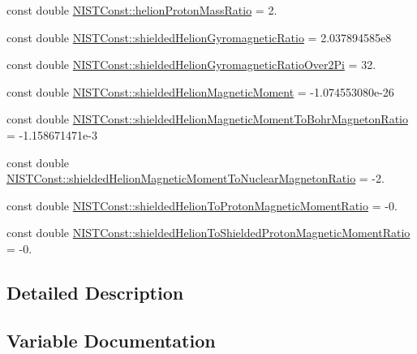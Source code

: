 \begin{DoxyCompactItemize}
\item 
const double \hyperlink{group___n_i_s_t_const-_helion_ga6ddd4a293fd1d7adac9a20dc6ee2a7d6}{N\+I\+S\+T\+Const\+::helion\+Proton\+Mass\+Ratio} = 2.
\item 
const double \hyperlink{group___n_i_s_t_const-_helion_gaf3b7dabd6de7a263aba710256e793c8e}{N\+I\+S\+T\+Const\+::shielded\+Helion\+Gyromagnetic\+Ratio} = 2.\+037894585e8
\item 
const double \hyperlink{group___n_i_s_t_const-_helion_gaed43f2ab9c5e89c6dda577a3b5fc265c}{N\+I\+S\+T\+Const\+::shielded\+Helion\+Gyromagnetic\+Ratio\+Over2\+Pi} = 32.
\item 
const double \hyperlink{group___n_i_s_t_const-_helion_ga1b0f92c14390afe726af4005e21c2ae8}{N\+I\+S\+T\+Const\+::shielded\+Helion\+Magnetic\+Moment} = -\/1.\+074553080e-\/26
\item 
const double \hyperlink{group___n_i_s_t_const-_helion_gac48304d45406c207fbadeca604d5c71a}{N\+I\+S\+T\+Const\+::shielded\+Helion\+Magnetic\+Moment\+To\+Bohr\+Magneton\+Ratio} = -\/1.\+158671471e-\/3
\item 
const double \hyperlink{group___n_i_s_t_const-_helion_gae3bf1eccb33e00a6da688959fd99bbb3}{N\+I\+S\+T\+Const\+::shielded\+Helion\+Magnetic\+Moment\+To\+Nuclear\+Magneton\+Ratio} = -\/2.
\item 
const double \hyperlink{group___n_i_s_t_const-_helion_ga9aa0ad55bc28f6402fcd872f9435547e}{N\+I\+S\+T\+Const\+::shielded\+Helion\+To\+Proton\+Magnetic\+Moment\+Ratio} = -\/0.
\item 
const double \hyperlink{group___n_i_s_t_const-_helion_ga3b8301672e9de426ef6bf13276b42acc}{N\+I\+S\+T\+Const\+::shielded\+Helion\+To\+Shielded\+Proton\+Magnetic\+Moment\+Ratio} = -\/0.
\end{DoxyCompactItemize}


\subsection{Detailed Description}


\subsection{Variable Documentation}
\mbox{\label{group___n_i_s_t_const-_helion_ga5c779784a4f223f0936cb067e2674474}} 

